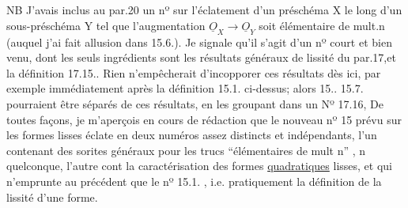 NB J'avais inclus au par.20 un nº sur l'éclatement d'un
préschéma X le long d'un sous-préschéma  Y tel que l'augmentation
$\underline{O}_X \longrightarrow \underline{O}_Y$ soit élémentaire de mult.n (auquel j'ai fait allusion dans
15.6.). Je signale qu'il s'agit d'un nº court et bien venu, dont les
seuls ingrédients sont les résultats généraux de lissité du par.17,et
la définition  17.15..  Rien n'empêcherait d'incopporer ces résultats
dès ici,  par exemple immédiatement après la définition
15.1. ci-dessus; alors  15..  15.7. pourraient être séparés
de ces  résultats, en les groupant dans un Nº 17.16, 
 De toutes façons, je m'aperçois en cours de rédaction que le
nouveau nº 15 prévu sur les formes lisses éclate en  deux numéros assez
distincts et indépendants, l'un contenant des sorites généraux pour
les trucs ``élémentaires de mult n'' , n quelconque, l'autre  cont la
caractérisation des formes \uline{quadratiques} lisses, et qui n'emprunte au
précédent que le nº 15.1. , i.e. pratiquement la définition de la lissité
d'une forme.

